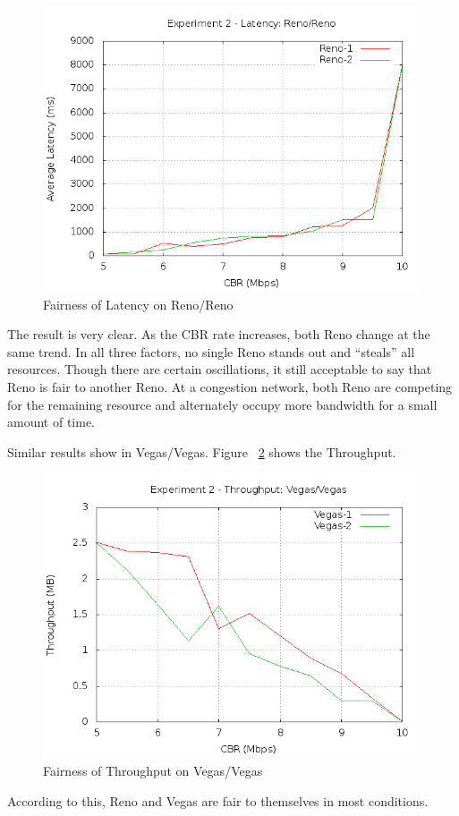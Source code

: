 \documentclass[10pt, conference]{lib/IEEEtran}
\begin{document}
\begin{figure}[H]
    \centering
    \includegraphics[width=1.0\linewidth]{plot/exp2-lt-Reno-Reno.png}
    \caption{Fairness of Latency on Reno/Reno}
    \label{fig:exp2_lt_rr}
\end{figure}
The result is very clear. As the CBR rate increases, both Reno change 
at the same trend. In all three factors, no single Reno stands out and 
``steals'' all resources. Though there are certain oscillations, it 
still acceptable to say that Reno is fair to another Reno. At a 
congestion network, both Reno are competing for the remaining resource
and alternately occupy more bandwidth for a small amount of time. 

Similar results show in Vegas/Vegas. Figure ~\ref{fig:exp2_thp_vv} shows the Throughput.
\begin{figure}[H]
    \centering
    \includegraphics[width=1.0\linewidth]{plot/exp2-thp-Vegas-Vegas.png}
    \caption{Fairness of Throughput on Vegas/Vegas}
    \label{fig:exp2_thp_vv}
\end{figure}
According to this, Reno and Vegas are fair to themselves in most conditions.
\end{document}
